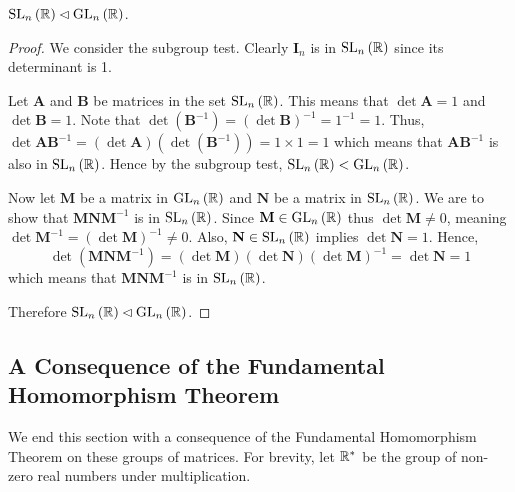 \begin{proposition}
    $\mathrm{SL}_{n}\left(\mathbb{R}\right) \lhd \mathrm{GL}_{n}\left(\mathbb{R}\right)$.
\end{proposition}
\begin{proof}
    We consider the subgroup test. Clearly $\textbf{I}_n$ is in $\mathrm{SL}_{n}\left(\mathbb{R}\right)$ since its determinant is 1.

    Let \textbf{A} and \textbf{B} be matrices in the set $\mathrm{SL}_{n}\left(\mathbb{R}\right)$. This means that $\det \textbf{A} = 1$ and $\det \textbf{B} = 1$. Note that $\det(\textbf{B}^{-1}) = (\det \textbf{B})^{-1} = 1^{-1} = 1$. Thus, $\det \textbf{AB}^{-1} = (\det \textbf{A})(\det(\textbf{B}^{-1})) = 1 \times 1  = 1$ which means that $\textbf{AB}^{-1}$ is also in $\mathrm{SL}_{n}\left(\mathbb{R}\right)$. Hence by the subgroup test, $\mathrm{SL}_{n}\left(\mathbb{R}\right) < \mathrm{GL}_{n}\left(\mathbb{R}\right)$.

    Now let $\textbf{M}$ be a matrix in $\mathrm{GL}_{n}\left(\mathbb{R}\right)$ and $\textbf{N}$ be a matrix in $\mathrm{SL}_{n}\left(\mathbb{R}\right)$. We are to show that $\textbf{MNM}^{-1}$ is in $\mathrm{SL}_{n}\left(\mathbb{R}\right)$. Since $\textbf{M} \in \mathrm{GL}_{n}\left(\mathbb{R}\right)$ thus $\det \textbf{M} \neq 0$, meaning $\det \textbf{M}^{-1} = (\det \textbf{M})^{-1} \neq 0$. Also, $\textbf{N} \in \mathrm{SL}_{n}\left(\mathbb{R}\right)$ implies $\det \textbf{N} = 1$. Hence,
    \[
        \det\left(\textbf{MNM}^{-1}\right) = (\det \textbf{M})(\det \textbf{N})(\det \textbf{M})^{-1} = \det \textbf{N} = 1
    \]
    which means that $\textbf{MNM}^{-1}$ is in $\mathrm{SL}_{n}\left(\mathbb{R}\right)$.

    Therefore $\mathrm{SL}_{n}\left(\mathbb{R}\right) \lhd \mathrm{GL}_{n}\left(\mathbb{R}\right)$.
\end{proof}

\subsection{A Consequence of the Fundamental Homomorphism Theorem}
We end this section with a consequence of the Fundamental Homomorphism Theorem on these groups of matrices. For brevity, let $\mathbb{R}^\ast$ be the group of non-zero real numbers under multiplication.

